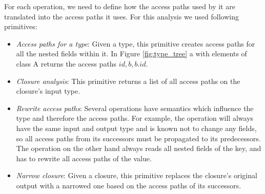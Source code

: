 For each operation, we need to define how the access paths used by it are translated into the access paths it uses. For this analysis we used following primitives:
\begin{itemize}
\item \emph{Access paths for a type}: Given a type, this primitive creates access paths for all the nested fields within it. In Figure \ref{fig:type_tree} a  with elements of class A returns the access paths ${id, b, b.id}$. 
\item \emph{Closure analysis}: This primitive returns a list of all access paths on the closure's input type.
\item \emph{Rewrite access paths}: Several operations have semantics which influence the type and therefore the access paths. For example, the  operation will always have the same input and output type and is known not to change any fields, so all access paths from its successors must be propagated to its predecessors. The  operation on the other hand always reads all nested fields of the key, and has to rewrite all access paths of the value.
\item \emph{Narrow closure}: Given a closure, this primitive replaces the closure's original output with a narrowed one based on the access paths of its successors.
\end{itemize}

